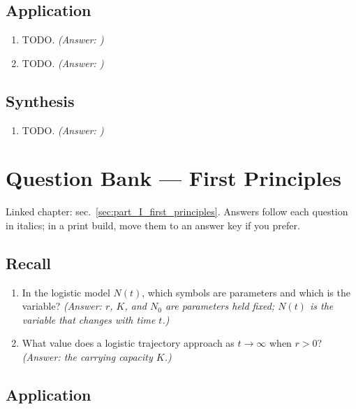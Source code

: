 \documentclass[
]{article}
\providecommand{\tightlist}{%
  \setlength{\itemsep}{0pt}\setlength{\parskip}{0pt}}
\theoremstyle{plain}
\theoremstyle{definition}
\begin{document}
\subsection{Application}\label{application-2}

\begin{enumerate}
\def\labelenumi{\arabic{enumi}.}
\setcounter{enumi}{2}
\item
  TODO. \emph{(Answer: )}
\item
  TODO. \emph{(Answer: )}
\end{enumerate}

\subsection{Synthesis}\label{synthesis-2}

\begin{enumerate}
\def\labelenumi{\arabic{enumi}.}
\setcounter{enumi}{4}
\item
  TODO. \emph{(Answer: )}
\end{enumerate}

\newpage

\section{Question Bank --- First
Principles}\label{sec:q_part_I_first_principles}

Linked chapter: sec.~\ref{sec:part_I_first_principles}. Answers follow
each question in italics; in a print build, move them to an answer key
if you prefer.

\subsection{Recall}\label{recall-3}

\begin{enumerate}
\def\labelenumi{\arabic{enumi}.}
\tightlist
\item
  In the logistic model \(N(t)\), which symbols are parameters and which
  is the variable? \emph{(Answer: \(r\), \(K\), and \(N_0\) are
  parameters held fixed; \(N(t)\) is the variable that changes with time
  \(t\).)}
\item
  What value does a logistic trajectory approach as \(t \to \infty\)
  when \(r > 0\)? \emph{(Answer: the carrying capacity \(K\).)}
\end{enumerate}

\subsection{Application}\label{application-3}
\end{document}
